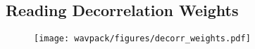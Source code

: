 
\subsection{Reading Decorrelation Weights}
\label{wavpack:read_decorrelation_weights}
{
  
}
\begin{figure}[h]
  \texttt{[image: wavpack/figures/decorr\_weights.pdf]}
\end{figure}

\clearpage

